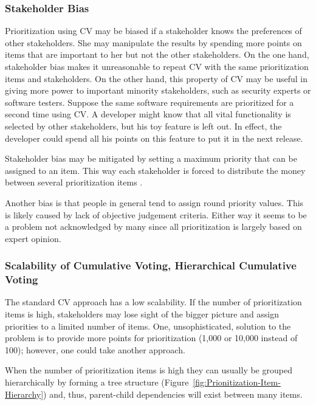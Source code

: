 \subsubsection{Stakeholder Bias\label{sub:Stakeholder-Bias}}

Prioritization using CV may be biased if a stakeholder knows the preferences
of other stakeholders. She may manipulate the results by spending more
points on items that are important to her but not the other stakeholders.
On the one hand, stakeholder bias makes it unreasonable to repeat CV
with the same prioritization items and stakeholders. On the other hand,
this property of CV may be useful in giving more power to important
minority stakeholders, such as security experts or software testers.
Suppose the same software requirements are prioritized for a second time using
CV. A developer might know that all vital functionality is selected by
other stakeholders, but his toy feature is left out. In effect, the developer
could spend all his points on this feature to put it in the next release. 

Stakeholder bias may be mitigated by setting a maximum priority that
can be assigned to an item. This way each stakeholder is forced to
distribute the money between several prioritization items \cite{Berander2006a}.

Another bias is that people in general tend to assign round priority
values. This is likely caused by lack of objective judgement criteria. Either
way it seems to be a problem not acknowledged by many since all prioritization is largely
based on expert opinion.


\subsubsection{Scalability of Cumulative Voting, Hierarchical Cumulative Voting\label{hcv}}

The standard CV approach has a low scalability. If the number of prioritization items
is high, stakeholders may lose sight of the bigger picture and assign priorities to a
limited number of items. One, unsophisticated, solution to the problem is to provide
more points for prioritization (1,000 or 10,000 instead of 100); however, one could take another approach. 

When the number of prioritization items is high they can usually 
be grouped hierarchically by forming a tree structure (Figure~\ref{fig:Prionitization-Item-Hierarchy}) and, thus, parent-child dependencies will exist between many items.

